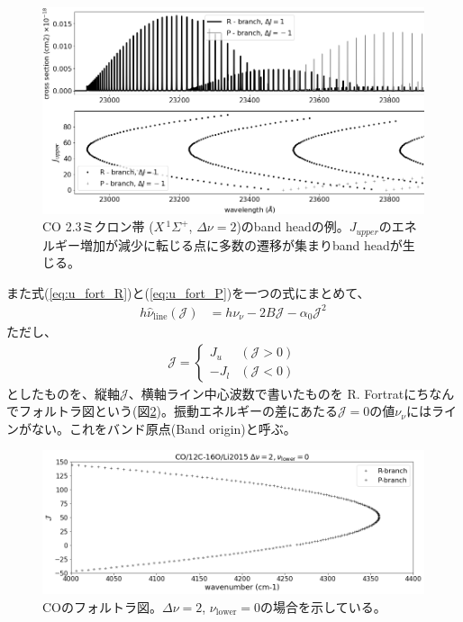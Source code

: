 \begin{figure}
    \centering
    \includegraphics[width=0.9\linewidth]{fig/bandhead.png}
    \caption{CO 2.3ミクロン帯 ($X\,^1 \Sigma^+$, $\Delta \nu = 2$)のband headの例。$J_{upper}$のエネルギー増加が減少に転じる点に多数の遷移が集まりband headが生じる。}
    \label{fig:rpbranch}
\end{figure}



また式(\ref{eq:u_fort_R})と(\ref{eq:u_fort_P})を一つの式にまとめて、
\begin{align}
    h \hat{\nu}_{\mathrm{line}} (\mathcal{J}) &=  h \nu_\nu - 2 B \mathcal{J} - \alpha_0 \mathcal{J}^2 
\end{align}
ただし、
\begin{align}
    \mathcal{J} = \left\{
\begin{array}{ll}
J_u & (\mathcal{J} > 0)\\
- J_l & (\mathcal{J} < 0)
\end{array}
\right.
\end{align}
としたものを、縦軸$\mathcal{J}$、横軸ライン中心波数で書いたものを
R. Fortratにちなんでフォルトラ図という(図\ref{fig:fortrat})。振動エネルギーの差にあたる$\mathcal{J}=0$の値$\nu_\nu$にはラインがない。これをバンド原点(Band origin)と呼ぶ。

\begin{figure}
    \centering
    \includegraphics[width=0.9\linewidth]{fig/fortrat.png}
    \caption{COのフォルトラ図。$\Delta \nu=2$, $\nu_\mathrm{lower}=0$の場合を示している。}
    \label{fig:fortrat}
\end{figure}
